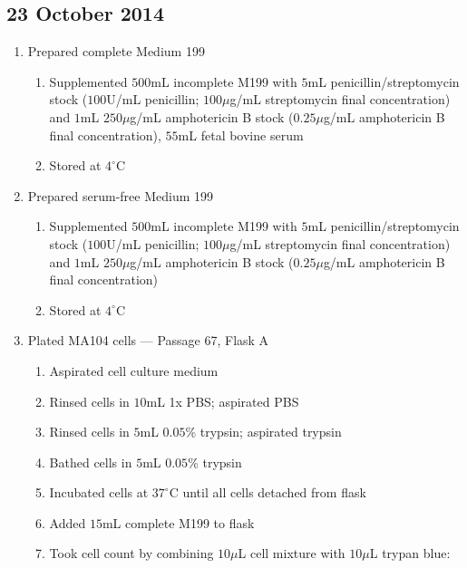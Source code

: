 \subsection*{23 October 2014}

\begin{enumerate}
	\item Prepared complete Medium 199
		\begin{enumerate}
				\item Supplemented $500$mL incomplete M199 with $5$mL penicillin/streptomycin stock ($100$U/mL penicillin; $100\mu$g/mL streptomycin final concentration) and $1$mL $250\mu$g/mL amphotericin B stock ($0.25\mu$g/mL amphotericin B final concentration), $55$mL fetal bovine serum
				\item Stored at $4^{\circ}$C
		\end{enumerate}
	\item Prepared serum-free Medium 199
		\begin{enumerate}
			\item Supplemented $500$mL incomplete M199 with $5$mL penicillin/streptomycin stock ($100$U/mL penicillin; $100\mu$g/mL streptomycin final concentration) and $1$mL $250\mu$g/mL amphotericin B stock ($0.25\mu$g/mL amphotericin B final concentration)
			\item Stored at $4^{\circ}$C
		\end{enumerate}
		
	\item Plated MA104 cells --- Passage 67, Flask A
		\begin{enumerate}
			\item Aspirated cell culture medium
			\item Rinsed cells in $10$mL 1x PBS; aspirated PBS
			\item Rinsed cells in $5$mL $0.05$\% trypsin; aspirated trypsin
			\item Bathed cells in $5$mL $0.05$\% trypsin
			\item Incubated cells at $37^{\circ}$C until all cells detached from flask
			\item Added $15$mL complete M199 to flask
			\item Took cell count by combining $10\mu$L cell mixture with $10\mu$L trypan blue:
			

\end{enumerate}
\end{enumerate}

